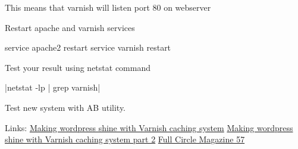 This means that varnish will listen port 80 on webserver

Restart apache and varnish services

service apache2 restart
service varnish restart

Test your result using netstat command

|netstat -lp | grep varnish|

Test new system with AB utility.

Links:
\href{http://kaanon.com/blog/work/making-wordpress-shine-varnish-caching-system-part-1}{Making wordpress shine with Varnish caching system}
\href{http://kaanon.com/blog/varnish/making-wordpress-shine-varnish-caching-system-part-2}{Making wordpress shine with Varnish caching system part 2}
\href{http://www.google.com/producer/editions/CAowvZtX/full_circle_magazine_57_lite}
{Full Circle Magazine 57}

